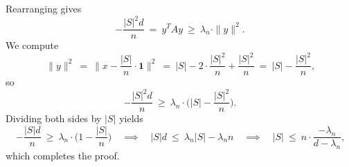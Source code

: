 \documentclass[12pt]{article}
\begin{document}
	\medskip
	
	Rearranging gives
	\[
		- \frac{|S|^{2} d}{n} \ = \ y^{T} A y \ \geqslant \ \lambda_{n} \cdot
		\|y\|^{2} \text{.}
	\]
	We compute
	\[
		\|y\|^{2} \ = \ \bigg\| x - \frac{|S|}{n} \cdot \mathbf{1} \bigg\|^{2} \
		= \ |S| - 2 \cdot \frac{|S|^{2}}{n} + \frac{|S|^{2}}{n} \ = \ |S| -
		\frac{|S|^{2}}{n} \text{,}
	\]
	so
	\[
		- \frac{|S|^{2} d}{n} \ \geqslant \ \lambda_{n} \cdot \bigg( |S| -
		\frac{|S|^{2}}{n} \bigg) \text{.}
	\]
	Dividing both sides by \(|S|\) yields
	\[
		- \frac{|S| d}{n} \ \geqslant \ \lambda_{n} \cdot \bigg( 1 -
		\frac{|S|}{n} \bigg) \quad \implies \quad |S| d \ \leqslant \
		\lambda_{n} |S| - \lambda_{n} n \quad \implies \quad |S| \ \leqslant \ n
		\cdot \frac{- \lambda_{n}}{d - \lambda_{n}} \text{,}
	\]
	which completes the proof.
\end{document}
